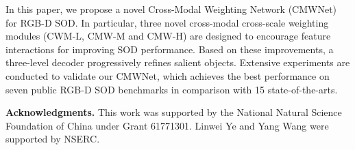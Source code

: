 \documentclass[runningheads]{llncs}
\begin{document}
In this paper, we propose a novel Cross-Modal Weighting Network (CMWNet) for RGB-D SOD. In particular, three novel cross-modal cross-scale weighting modules (CWM-L, CMW-M and CMW-H) are designed to encourage feature interactions for improving SOD performance. 
Based on these improvements, a three-level decoder progressively refines salient objects.
Extensive experiments are conducted to validate our CMWNet, which achieves the best performance on seven public RGB-D SOD benchmarks in comparison with 15 state-of-the-arts.

\noindent\textbf{Acknowledgments.}
This work was supported by the National Natural Science Foundation of China under Grant 61771301.
Linwei Ye and Yang Wang were supported by NSERC.



\end{document}
